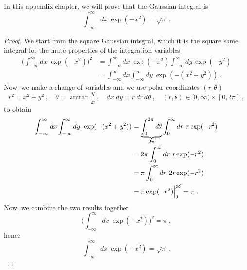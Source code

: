     In this appendix chapter, we will prove that the Gaussian integral is
    \begin{equation}\label{app:gauss}
        \int_{-\infty}^\infty dx ~ \exp(- x^2) = \sqrt{\pi} ~.
    \end{equation}
    \begin{proof}
        We start from the square Gaussian integral, which it is the square same integral for the mute properties of the integration variables 
        \begin{equation*}
        \begin{aligned}
            \Big (\int_{-\infty}^\infty dx ~ \exp(- x^2) \Big)^2 & = \int_{-\infty}^\infty dx ~ \exp(- x^2) \int_{-\infty}^\infty dy ~ \exp(- y^2) \\ & = \int_{-\infty}^\infty dx \int_{-\infty}^\infty dy ~ \exp(- (x^2 + y^2)) ~.
        \end{aligned}
        \end{equation*}
        Now, we make a change of variables and we use polar coordinates $(r, \theta)$
        \begin{equation*}
            r^2 = x^2 + y^2 ~, \quad \theta = \arctan \frac{y}{x} ~, \quad dx ~ dy = r ~ dr ~ d\theta ~, \quad (r, \theta) \in [0, \infty) \times [0, 2\pi] ~,
        \end{equation*} 
        to obtain
        \begin{equation*}
        \begin{aligned}
            \int_{-\infty}^\infty dx \int_{-\infty}^\infty dy ~ \exp(- (x^2 + y^2)) & = \underbrace{\int_0^{2\pi} d\theta}_{2\pi} \int_0^\infty dr ~ r \exp(- r^2) \\ & = 2 \pi \int_0^\infty dr ~ r \exp(- r^2) \\ & = \pi \int_0^\infty dr ~ 2 r \exp(- r^2) \\ & = \pi \exp(- r^2) \Big \vert_0^{\cancel \infty} = \pi ~.
        \end{aligned}
        \end{equation*}
        Now, we combine the two results together
        \begin{equation*}
            \Big (\int_{-\infty}^\infty dx ~ \exp(- x^2) \Big)^2 = \pi ~,
        \end{equation*}
        hence
        \begin{equation*}
            \int_{-\infty}^\infty dx ~ \exp(- x^2) = \sqrt{\pi} ~.
        \end{equation*}
    \end{proof}
    